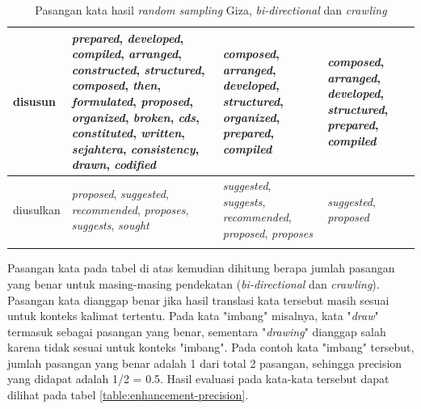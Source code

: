 \begin{longtable}{|p{3cm}|p{3cm}|p{3cm}|p{3cm}|}
		disusun & \textit{prepared}, \textit{developed}, \textit{compiled}, \textit{arranged}, \textit{constructed}, \textit{structured}, \textit{composed}, \textit{then}, \textit{formulated}, \textit{proposed}, \textit{organized}, \textit{broken}, \textit{cds}, \textit{constituted}, \textit{written}, \textit{sejahtera}, \textit{consistency}, \textit{drawn}, \textit{codified} & \textit{composed}, \textit{arranged}, \textit{developed}, \textit{structured}, \textit{organized}, \textit{prepared}, \textit{compiled} & \textit{composed}, \textit{arranged}, \textit{developed}, \textit{structured}, \textit{prepared}, \textit{compiled} \\ \hline
		diusulkan & \textit{proposed}, \textit{suggested}, \textit{recommended}, \textit{proposes}, \textit{suggests}, \textit{sought} & \textit{suggested}, \textit{suggests}, \textit{recommended}, \textit{proposed}, \textit{proposes} & \textit{suggested}, \textit{proposed} \\ \hline
		\caption{Pasangan kata hasil \textit{random sampling} Giza, \textit{bi-directional} dan \textit{crawling}}
		\label{table:random-sampling-enhancement}
	\end{longtable}

Pasangan kata pada tabel di atas kemudian dihitung berapa jumlah pasangan yang benar untuk masing-masing pendekatan (\textit{bi-directional} dan \textit{crawling}). Pasangan kata dianggap benar jika hasil translasi kata tersebut masih sesuai untuk konteks kalimat tertentu. Pada kata "imbang" misalnya, kata "\textit{draw}" termasuk sebagai pasangan yang benar, sementara "\textit{drawing}" dianggap salah karena tidak sesuai untuk konteks "imbang". Pada contoh kata "imbang" tersebut, jumlah pasangan yang benar adalah 1 dari total 2 pasangan, sehingga precision yang didapat adalah 1/2 = 0.5. Hasil evaluasi pada kata-kata tersebut dapat dilihat pada tabel \ref{table:enhancement-precision}.


